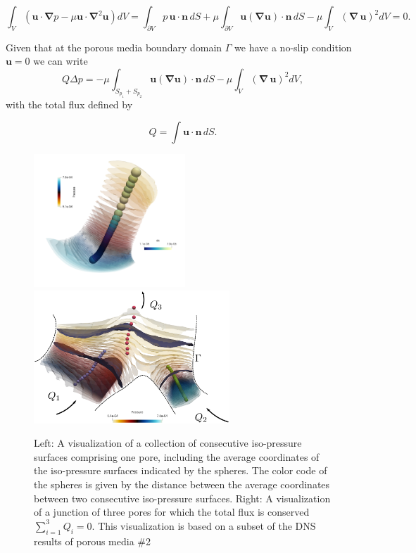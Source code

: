 \documentclass[draft]{agujournal2019}
\begin{document}
\begin{equation}
\int_V \left(\mathbf{u}\cdot\mathbf{\nabla} p-\mu \mathbf{u}\cdot\mathbf{\nabla}^2 \mathbf{u}\right) dV 
= \int_{\partial V}  p\,\mathbf{u}\cdot\mathbf{n}\,dS+\mu \int_{\partial V} \mathbf{u} (\mathbf{\nabla} \mathbf{u})\cdot\mathbf{n}\,dS-\mu \int_{V} (\mathbf{\nabla}\, \mathbf{u})^2 dV=0. \label{eq:stokes_dissipation}
\end{equation}

Given that at the porous media boundary domain $\Gamma$ we have a no-slip condition $\mathbf{u}=0$ we can write 
\begin{equation}
	Q \Delta p = -\mu\int_{S_{p_1}+S_{p_2}} \mathbf{u} (\mathbf{\nabla} \mathbf{u})\cdot\mathbf{n}\,dS -\mu \int_V (\mathbf{\nabla}\, \mathbf{u})^2 dV, \label{eq:pressuredrop}
\end{equation}
with the total flux defined by 

\begin{equation}
	Q=\int \mathbf{u}\cdot\mathbf{n}\, dS.
\end{equation}


\begin{figure}[t!]
\includegraphics[height=5cm]{figures/example_pore.png}~~~~
\includegraphics[height=5cm]{figures/merging_pores.eps}
\caption{Left: A visualization of a collection of consecutive iso-pressure surfaces comprising one pore, including the average coordinates of the iso-pressure surfaces indicated by the spheres. The color code of the spheres is given by the distance between the average coordinates between two consecutive iso-pressure surfaces. Right: A visualization of a junction of three pores for which the total flux is conserved $\sum_{i=1}^3 Q_i = 0$. This visualization is based on a subset of the DNS results of porous media \#2}
\label{fig:isop_surfaces}
\end{figure}
\end{document}
